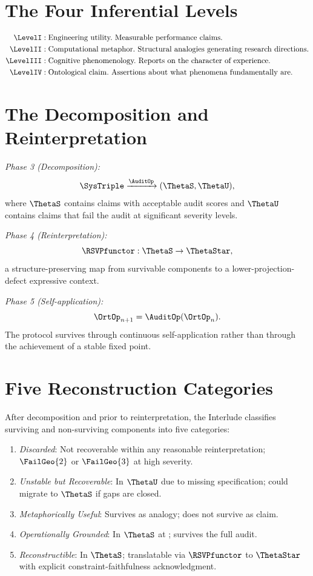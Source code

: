 \section{The Four Inferential Levels}
\label{app-g:levels}

\begin{align*}
  \LevelI  &: \text{Engineering utility.}
  \text{ Measurable performance claims.}\\
  \LevelII &: \text{Computational metaphor.}
  \text{ Structural analogies generating research directions.}\\
  \LevelIII&: \text{Cognitive phenomenology.}
  \text{ Reports on the character of experience.}\\
  \LevelIV &: \text{Ontological claim.}
  \text{ Assertions about what phenomena fundamentally are.}
\end{align*}

\section{The Decomposition and Reinterpretation}
\label{app-g:decomposition}

\textit{Phase 3 (Decomposition):}
\[
  \SysTriple \xrightarrow{\AuditOp} (\ThetaS, \ThetaU),
\]
where $\ThetaS$ contains claims with acceptable
audit scores and $\ThetaU$ contains claims that fail
the audit at significant severity levels.

\textit{Phase 4 (Reinterpretation):}
\[
  \RSVPfunctor : \ThetaS \to \ThetaStar,
\]
a structure-preserving map from survivable components
to a lower-projection-defect expressive context.

\textit{Phase 5 (Self-application):}
\[
  \OrtOp_{n+1} = \AuditOp(\OrtOp_n).
\]
The protocol survives through continuous self-application
rather than through the achievement of a stable fixed point.

\section{Five Reconstruction Categories}
\label{app-g:categories}

After decomposition and prior to reinterpretation,
the Interlude classifies surviving and non-surviving
components into five categories:

\begin{enumerate}
  \item \textit{Discarded}: Not recoverable within any
  reasonable reinterpretation; $\FailGeo{2}$ or $\FailGeo{3}$
  at high severity.
  \item \textit{Unstable but Recoverable}: In $\ThetaU$
  due to missing specification; could migrate to $\ThetaS$
  if gaps are closed.
  \item \textit{Metaphorically Useful}: Survives as
  \LevelII{} analogy; does not survive as \LevelIV{} claim.
  \item \textit{Operationally Grounded}: In $\ThetaS$
  at \LevelI{}; survives the full audit.
  \item \textit{Reconstructible}: In $\ThetaS$;
  translatable via $\RSVPfunctor$ to $\ThetaStar$
  with explicit constraint-faithfulness acknowledgment.
\end{enumerate}

